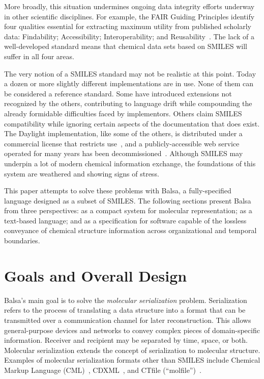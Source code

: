 \documentclass{article}
\begin{document}
More broadly, this situation undermines ongoing data integrity efforts underway in other scientific disciplines. For example, the FAIR Guiding Principles identify four qualities essential for extracting maximum utility from published scholarly data: Findability; Accessibility; Interoperability; and Reusability~\cite{wilkinson:2016}. The lack of a well-developed standard means that chemical data sets based on SMILES will suffer in all four areas.

The very notion of a SMILES standard may not be realistic at this point. Today a dozen or more slightly different implementations are in use. None of them can be considered a reference standard. Some have introduced extensions not recognized by the others, contributing to language drift while compounding the already formidable difficulties faced by implementors. Others claim SMILES compatibility while ignoring certain aspects of the documentation that does exist. The Daylight implementation, like some of the others, is distributed under a commercial license that restricts use~\cite{daylightToolkit}, and a publicly-accessible web service operated for many years has been decommissioned~\cite{depictArchive}. Although SMILES may underpin a lot of modern chemical information exchange, the foundations of this system are weathered and showing signs of stress.

This paper attempts to solve these problems with Balsa, a fully-specified language designed as a subset of SMILES. The following sections present Balsa from three perspectives: as a compact system for molecular representation; as a text-based language; and as a specification for software capable of the lossless conveyance of chemical structure information across organizational and temporal boundaries.

\section*{Goals and Overall Design}

Balsa's main goal is to solve the \textit{molecular serialization} problem. Serialization refers to the process of translating a data structure into a format that can be transmitted over a communication channel for later reconstruction. This allows general-purpose devices and networks to convey complex pieces of domain-specific information. Receiver and recipient may be separated by time, space, or both. Molecular serialization extends the concept of serialization to molecular structure. Examples of molecular serialization formats other than SMILES include Chemical Markup Language (CML)~\cite{murray-rust:2011}, CDXML~\cite{cdxml}, and CTfile (\enquote{molfile})~\cite{ctfileFormats}.
\end{document}
